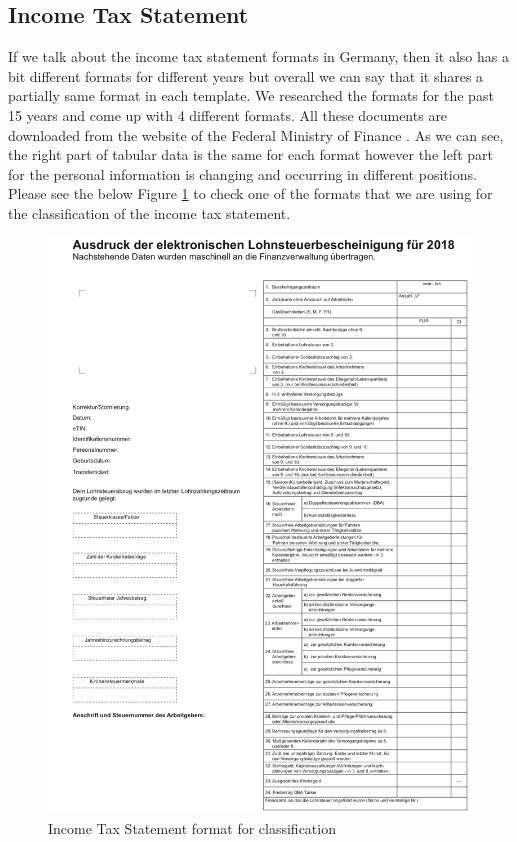 \subsection{Income Tax Statement}
If we talk about the income tax statement formats in Germany, then it also has a bit different formats for different years but overall we can say that it shares a partially same format in each template. We researched the formats for the past 15 years and come up with 4 different formats. All these documents are downloaded from the website of the Federal Ministry of Finance . As we can see, the right part of tabular data is the same for each format however the left part for the personal information is changing and occurring in different positions. Please see the below Figure \ref{ls_formats} to check one of the formats that we are using for the classification of the income tax statement. 
\begin{figure}[H]
\centering
\includegraphics[scale=0.6]{images/Chapter3/ls-format-1.png}
\caption{Income Tax Statement format for classification}
\label{ls_formats}
\end{figure}
\par
